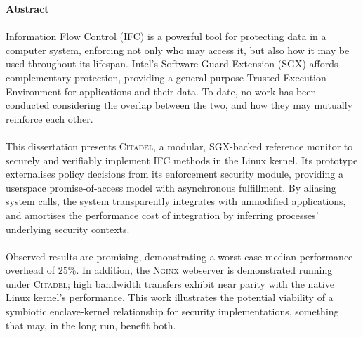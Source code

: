 \newpage
{\Huge \bf Abstract}
\vspace{24pt} 


\paragraph{} Information Flow Control (IFC) is a powerful tool for protecting data in a computer system, enforcing not only who may access it, but also how it may be used throughout its lifespan. Intel's Software Guard Extension (SGX) affords complementary protection, providing a general purpose Trusted Execution Environment for applications and their data. To date, no work has been conducted considering the overlap between the two, and how they may mutually reinforce each other.

\paragraph{} This dissertation presents \textsc{Citadel}, a modular, SGX-backed reference monitor to securely and verifiably implement IFC methods in the Linux kernel. Its prototype externalises policy decisions from its enforcement security module, providing a userspace promise-of-access model with asynchronous fulfillment. By aliasing system calls, the system transparently integrates with unmodified applications, and amortises the performance cost of integration by inferring processes' underlying security contexts.

\paragraph{} Observed results are promising, demonstrating a worst-case median performance overhead of $25\%$. In addition, the \textsc{Nginx} webserver is demonstrated running under \textsc{Citadel}; high bandwidth transfers exhibit near parity with the native Linux kernel's performance. This work illustrates the potential viability of a symbiotic enclave-kernel relationship for security implementations, something that may, in the long run, benefit both.




\newpage
\vspace*{\fill}
